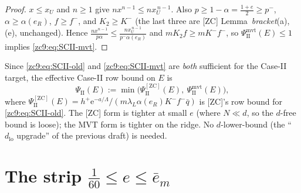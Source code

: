 \documentclass[11pt]{amsart}
\newcommand{\eu}{\mathrm{e}}
\begin{document}
\begin{proof}
$x\le x_U$ and $n\ge1$ give $n x^{n-1}\le n x_U^{\,n-1}$.  Also $p\ge1-\alpha=
\tfrac{1+e}2\ge p^-$, $\alpha\ge\alpha(e_R)$, $f\ge f^-$, and $K_2\ge K^-$
(the last three are [ZC] Lemma~\emph{bracket}(a),(e), unchanged).  Hence
$\tfrac{n x^{n-1}}{p\alpha}\le\tfrac{n x_U^{\,n-1}}{p^-\alpha(e_R)}$ and
$mK_2f\ge m K^-f^-$, so
$\Psi_{\mathrm{II}}^{\mathrm{mvt}}(E)\le1$ implies \eqref{zc9:eq:SCII-mvt}.
\end{proof}

Since \eqref{zc9:eq:SCII-old} and \eqref{zc9:eq:SCII-mvt} are \emph{both}
sufficient for the Case-II target, the effective Case-II row bound on $E$ is
\begin{equation}\label{zc9:eq:PsiII}
 \Psi_{\mathrm{II}}(E):=\min\bigl(\Psi_{\mathrm{II}}^{\mathrm{[ZC]}}(E),\
 \Psi_{\mathrm{II}}^{\mathrm{mvt}}(E)\bigr),
\end{equation}
where $\Psi_{\mathrm{II}}^{\mathrm{[ZC]}}(E)=h^+\eu^{-a/\Lambda}/
(m\lambda_L\alpha(e_R)K^-f^-\bar q)$ is [ZC]'s row bound for
\eqref{zc9:eq:SCII-old}.  The [ZC] form is tighter at small $e$ (where $N\ll d$,
so the $d$-free bound is loose); the MVT form is tighter on the ridge.
No $d$-lower-bound (the ``$d_{\mathrm{lo}}$ upgrade'' of the previous draft) is
needed.

\section{The strip $\tfrac1{60}\le e\le\bar e_m$}\label{zc9:sec:strip}
\end{document}
